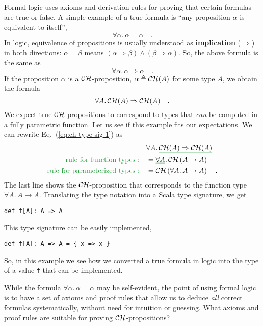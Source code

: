 Formal logic uses axioms and derivation rules for proving that certain
formulas are true or false. A simple example of a true formula is
``any proposition $\alpha$ is equivalent to itself'',
\[
\forall\alpha.\,\alpha=\alpha\quad.
\]
In logic, equivalence of propositions is usually understood as \textbf{implication}
($\Rightarrow$) in both directions: $\alpha=\beta$ means $\left(\alpha\Rightarrow\beta\right)\wedge\left(\beta\Rightarrow\alpha\right)$.
So, the above formula is the same as
\[
\forall\alpha.\,\alpha\Rightarrow\alpha\quad.
\]
If the proposition $\alpha$ is a ${\cal CH}$-proposition, $\alpha\triangleq{\cal CH}(A)$
for some type $A$, we obtain the formula
\begin{equation}
\forall A.\,{\cal CH}(A)\Rightarrow{\cal CH}(A)\quad.\label{eq:ch-type-sig-1}
\end{equation}
We expect true ${\cal CH}$-propositions to correspond to types that
\emph{can} be computed in a fully parametric function. Let us see
if this example fits our expectations. We can rewrite Eq.~(\ref{eq:ch-type-sig-1})
as
\begin{align*}
 & \forall A.\,\gunderline{{\cal CH}(A)\Rightarrow{\cal CH}(A)}\\
{\color{greenunder}\text{rule for function types}:}\quad & =\gunderline{\forall A}.\,{\cal CH}\left(A\rightarrow A\right)\\
{\color{greenunder}\text{rule for parameterized types}:}\quad & ={\cal CH}\left(\forall A.\,A\rightarrow A\right)\quad.
\end{align*}
The last line shows the ${\cal CH}$-proposition that corresponds
to the function type $\forall A.\,A\rightarrow A$. Translating the
type notation into a Scala type signature, we get
\begin{lstlisting}
def f[A]: A => A
\end{lstlisting}
This type signature can be easily implemented,
\begin{lstlisting}
def f[A]: A => A = { x => x }
\end{lstlisting}
So, in this example we see how we converted a true formula in logic
into the type of a value \lstinline!f! that can be implemented.

While the formula $\forall\alpha.\,\alpha=\alpha$ may be self-evident,
the point of using formal logic is to have a set of axioms and proof
rules that allow us to deduce \emph{all} correct formulas systematically,
without need for intuition or guessing. What axioms and proof rules
are suitable for proving ${\cal CH}$-propositions?

